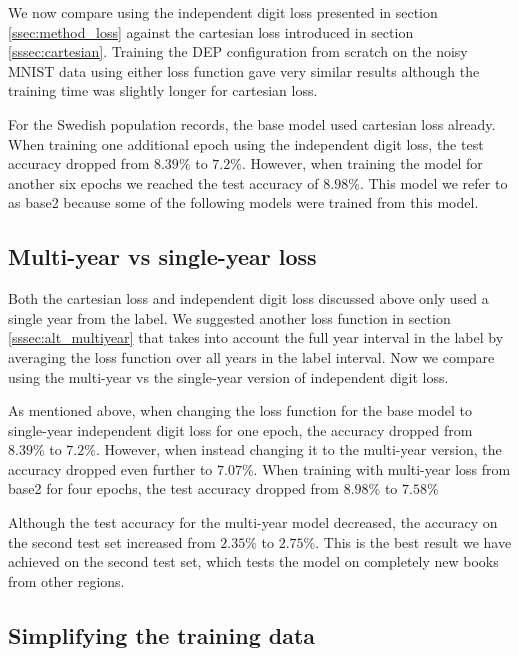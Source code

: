 We now compare using the independent digit loss presented in section \ref{ssec:method_loss} against the cartesian loss introduced in section \ref{sssec:cartesian}.
Training the DEP configuration from scratch on the noisy MNIST data using either loss function gave very similar results although the training time was slightly longer for cartesian loss.

For the Swedish population records, the base model used cartesian loss already. When training one additional epoch using the independent digit loss, the test accuracy dropped from $8.39\%$ to $7.2\%$. However, when training the model for another six epochs we reached the test accuracy of $8.98\%$. This model we refer to as base2 because some of the following models were trained from this model.

\subsection{Multi-year vs single-year loss} \label{ssec:result_multiyear}

Both the cartesian loss and independent digit loss discussed above only used a single year from the label. We suggested another loss function in section \ref{sssec:alt_multiyear} that takes into account the full year interval in the label by averaging the loss function over all years in the label interval. Now we compare using the multi-year vs the single-year version of independent digit loss.

As mentioned above, when changing the loss function for the base model to single-year independent digit loss for one epoch, the accuracy dropped from $8.39\%$ to $7.2\%$. However, when instead changing it to the multi-year version, the accuracy dropped even further to $7.07\%$. When training with multi-year loss from base2 for four epochs, the test accuracy dropped from $8.98\%$ to $7.58\%$

Although the test accuracy for the multi-year model decreased, the accuracy on the second test set increased from $2.35\%$ to $2.75\%$. This is the best result we have achieved on the second test set, which tests the model on completely new books from other regions.


\subsection{Simplifying the training data}

